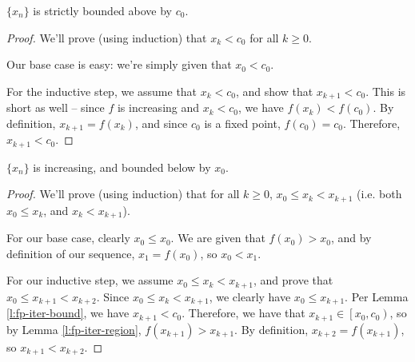 

\begin{lemma}
\label{l:fp-iter-bound}
$\{x_n\}$ is strictly bounded above by $c_0$.
\end{lemma}
\begin{proof}
We'll prove (using induction) that $x_k < c_0$ for all $k \geq 0$. 

Our base case is easy: we're simply given that $x_0 < c_0$.

For the inductive step, we assume that $x_k < c_0$, and show that $x_{k+1} < c_0$. This is short as well -- since $f$ is increasing and $x_k < c_0$, we have $f(x_k) < f(c_0)$. By definition, $x_{k+1} = f(x_k)$, and since $c_0$ is a fixed point, $f(c_0) = c_0$. Therefore, $x_{k+1} < c_0$. 
\end{proof}


\begin{lemma}
\label{l:fp-iter-increasing-lower-bound}
$\{x_n\}$ is increasing, and bounded below by $x_0$. 
\end{lemma}
\begin{proof}
We'll prove (using induction) that for all $k \geq 0$, $x_0 \leq x_k < x_{k+1}$ (i.e. both $x_0 \leq x_k$, and $x_k < x_{k+1}$). 

For our base case, clearly $x_0 \leq x_0$. We are given that $f(x_0) > x_0$, and by definition of our sequence, $x_1 = f(x_0)$, so $x_0 < x_1$.

For our inductive step, we assume $x_0 \leq x_k < x_{k+1}$, and prove that $x_0 \leq x_{k+1} < x_{k+2}$. Since $x_0 \leq x_k < x_{k+1}$, we clearly have $x_0 \leq x_{k+1}$. Per Lemma \ref{l:fp-iter-bound}, we have $x_{k+1} < c_0$. Therefore, we have that $x_{k+1} \in \left[x_0, c_0\right)$, so by Lemma \ref{l:fp-iter-region}, $f(x_{k+1}) > x_{k+1}$. By definition, $x_{k+2} = f(x_{k+1})$, so $x_{k+1} < x_{k+2}$. 

\end{proof}

